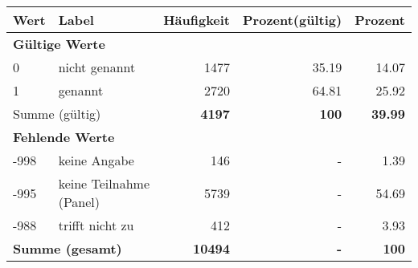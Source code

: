      \begin{longtable}{lXrrr}
     \toprule
     \textbf{Wert} & \textbf{Label} & \textbf{Häufigkeit} & \textbf{Prozent(gültig)} & \textbf{Prozent} \\
     \endhead
     \midrule
     \multicolumn{5}{l}{\textbf{Gültige Werte}}\\

     0 &
     \multicolumn{1}{X}{ nicht genannt   } &


       \num{1477} &
       \num[round-mode=places,round-precision=2]{35.19} &
         \num[round-mode=places,round-precision=2]{14.07} \\

     1 &
     \multicolumn{1}{X}{ genannt   } &


       \num{2720} &
       \num[round-mode=places,round-precision=2]{64.81} &
         \num[round-mode=places,round-precision=2]{25.92} \\
     \midrule
     \multicolumn{2}{l}{Summe (gültig)} &
       \textbf{\num{4197}} &
     \textbf{\num{100}} &
       \textbf{\num[round-mode=places,round-precision=2]{39.99}} \\
     \multicolumn{5}{l}{\textbf{Fehlende Werte}}\\
       -998 &
       keine Angabe &
         \num{146} &
        - &
         \num[round-mode=places,round-precision=2]{1.39} \\
       -995 &
       keine Teilnahme (Panel) &
         \num{5739} &
        - &
         \num[round-mode=places,round-precision=2]{54.69} \\
       -988 &
       trifft nicht zu &
         \num{412} &
        - &
         \num[round-mode=places,round-precision=2]{3.93} \\
     \midrule
     \multicolumn{2}{l}{\textbf{Summe (gesamt)}} &
          \textbf{\num{10494}} &
        \textbf{-} &
        \textbf{\num{100}} \\
     \bottomrule
     \end{longtable}
     
